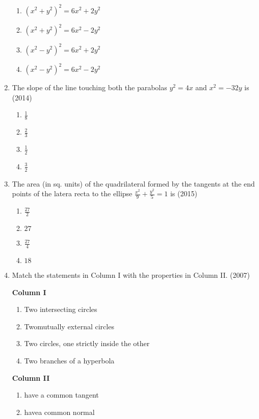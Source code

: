 \begin{enumerate}
\begin{multicols}{2}
\begin{enumerate}
    \item $(x^2+y^2)^2=6x^2+2y^2$
    \item $(x^2+y^2)^2=6x^2-2y^2$
    \item $(x^2-y^2)^2=6x^2+2y^2$
    \item $(x^2-y^2)^2=6x^2-2y^2$
\end{enumerate}
\end{multicols}
\item The slope of the line touching both the parabolas $y^2=4x$ and $x^2=-32y$ is
\hfill(2014)
\begin{multicols}{4}
\begin{enumerate}
    \item $\frac{1}{8}$
    \item $\frac{2}{3}$
    \item $\frac{1}{2}$
    \item $\frac{3}{2}$
\end{enumerate}
\end{multicols}
\item The area (in sq. units) of the quadrilateral formed by the tangents at the end points of the latera recta to the ellipse $\frac{x^2}{9}+\frac{y^2}{5}=1$ is \hfill(2015)
\begin{multicols}{4}
\begin{enumerate}
    \item $\frac{27}{2}$
    \item $27$
    \item $\frac{27}{4}$
    \item $18$
\end{enumerate}
\end{multicols}
\item Match the statements in Column I with the properties in Column II.
	\hfill{(2007)}
\begin{multicols}{2}
\textbf{Column I}
\begin{enumerate}
    \item  Two intersecting circles
    \item Twomutually external circles
    \item Two circles, one strictly inside the other 
    \item  Two branches of a hyperbola  
\end{enumerate}
\textbf{Column II}
\begin{enumerate}
    \item have a common tangent 
    \item havea common normal 

\end{enumerate}
\end{multicols}
\end{enumerate}
